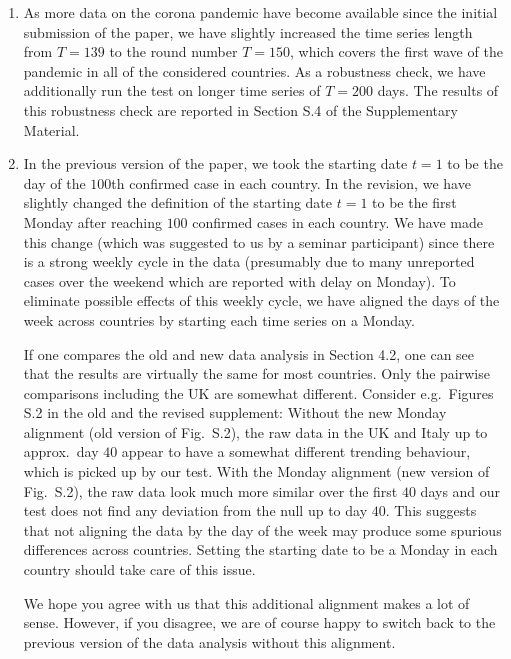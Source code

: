 \documentclass[a4paper,12pt]{article}
\begin{document}
\begin{enumerate}[label=(\roman*), leftmargin=0.8cm]

\item As more data on the corona pandemic have become available since the initial submission of the paper, we have slightly increased the time series length from $T=139$ to the round number $T=150$, which covers the first wave of the pandemic in all of the considered countries. As a robustness check, we have additionally run the test on longer time series of $T=200$ days. The results of this robustness check are reported in Section S.4 of the Supplementary Material. 

\item In the previous version of the paper, we took the starting date $t=1$ to be the day of the $100$th confirmed case in each country. In the revision, we have slightly changed the definition of the starting date $t=1$ to be the first Monday after reaching $100$ confirmed cases in each country. We have made this change (which was suggested to us by a seminar participant) since there is a strong weekly cycle in the data (presumably due to many unreported cases over the weekend which are reported with delay on Monday). To eliminate possible effects of this weekly cycle, we have aligned the days of the week across countries by starting each time series on a Monday. 

If one compares the old and new data analysis in Section 4.2, one can see that the results are virtually the same for most countries. Only the pairwise comparisons including the UK are somewhat different. Consider e.g.\ Figures S.2 in the old and the revised supplement: Without the new Monday alignment (old version of Fig.\ S.2), the raw data in the UK and Italy up to approx.\ day $40$ appear to have a somewhat different trending behaviour, which is picked up by our test. With the Monday alignment (new version of Fig.\ S.2), the raw data look much more similar over the first $40$ days and our test does not find any deviation from the null up to day $40$. This suggests that not aligning the data by the day of the week may produce some spurious differences across countries. Setting the starting date to be a Monday in each country should take care of this issue. 

We hope you agree with us that this additional alignment makes a lot of sense. However, if you disagree, we are of course happy to switch back to the previous version of the data analysis without this alignment. 

\end{enumerate}
\end{document}
